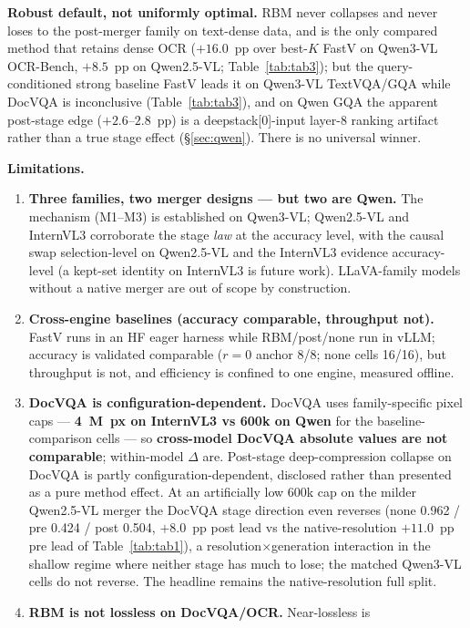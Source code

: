 \documentclass[sigconf,review,anonymous]{acmart}
\begin{document}
\textbf{Robust default, not uniformly optimal.} RBM never collapses and never
loses to the post-merger family on text-dense data, and is the only compared
method that retains dense OCR ($+16.0$~pp over best-$K$ FastV on Qwen3-VL
OCR-Bench, $+8.5$~pp on Qwen2.5-VL; Table~\ref{tab:tab3}); but the
query-conditioned strong baseline FastV leads it on Qwen3-VL TextVQA/GQA while
DocVQA is inconclusive (Table~\ref{tab:tab3}), and on Qwen GQA the apparent
post-stage edge ($+2.6$--$2.8$~pp) is a deepstack[0]-input layer-8 ranking
artifact rather than a true stage effect (\S\ref{sec:qwen}).
There is no universal winner.

\textbf{Limitations.}
\begin{enumerate}
  \item \textbf{Three families, two merger designs --- but two are Qwen.} The
    mechanism (M1--M3) is established on Qwen3-VL; Qwen2.5-VL and InternVL3
    corroborate the stage \emph{law} at the accuracy level, with the causal swap
    selection-level on Qwen2.5-VL and the InternVL3 evidence accuracy-level (a
    kept-set identity on InternVL3 is future work). LLaVA-family models without
    a native merger are out of scope by construction.
  \item \textbf{Cross-engine baselines (accuracy comparable, throughput not).}
    FastV runs in an HF eager harness while RBM/post/none run in vLLM; accuracy
    is validated comparable ($r = 0$ anchor 8/8; none cells 16/16), but
    throughput is not, and efficiency is confined to one engine, measured
    offline.
  \item \textbf{DocVQA is configuration-dependent.} DocVQA uses family-specific
    pixel caps --- \textbf{4~M~px on InternVL3 vs 600k on Qwen} for the
    baseline-comparison cells --- so \textbf{cross-model DocVQA absolute values
    are not comparable}; within-model $\Delta$ are. Post-stage deep-compression
    collapse on DocVQA is partly configuration-dependent, disclosed rather than
    presented as a pure method effect. At an artificially low 600k cap on the
    milder Qwen2.5-VL merger the DocVQA stage direction even reverses (none
    0.962 / pre 0.424 / post 0.504, $+8.0$~pp post lead vs the
    native-resolution $+11.0$~pp pre lead of Table~\ref{tab:tab1}), a
    resolution$\times$generation interaction in the shallow regime where neither
    stage has much to lose; the matched Qwen3-VL cells do not reverse. The
    headline remains the native-resolution full split.
  \item \textbf{RBM is not lossless on DocVQA/OCR.} Near-lossless is

\end{enumerate}
\end{document}
